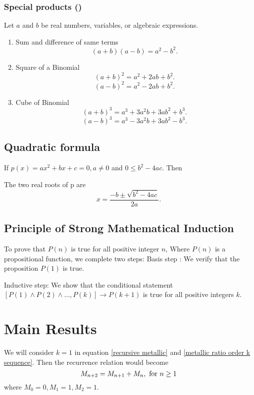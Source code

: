 \documentclass{rmutt-seminar}
\begin{document}
\subsubsection*{Special products (\cite{EP95})}
Let $a$ and $b$ be real numbers, variables, or algebraic expressions.
\begin{enumerate}
	\item Sum and difference of same terms 
	 $$(a+b)(a-b) = a^2-b^2.$$
	\item Square of a Binomial 
	 $$(a+b)^2 = a^2 +2ab+b^2.$$ 
	 $$(a-b)^2 = a^2 -2ab+b^2.$$
	\item Cube of Binomial 
	 $$(a+b)^3 = a^3+3a^2b+3ab^2+b^3.$$ 
	 $$(a-b)^3 = a^3-3a^2b+3ab^2-b^3.$$
\end{enumerate}

\subsection*{Quadratic formula}
\begin{theorem}[\cite{DC95}]
	If $ p(x) = ax^2 +bx + c = 0, a \neq 0 $ and $ 0 \leq b^2 - 4ac $. Then
	 
	The two real roots of  p are 
\begin{equation*}\label{quadratic formula}
	x= \frac{-b \pm \sqrt{b^2 - 4ac}}{2a}.
\end{equation*}
\end{theorem}
\subsection*{Principle of Strong Mathematical Induction}
\begin{theorem}[\cite{C10}] 
	To prove that $P(n)$ is true for all positive integer $n$, Where $P(n)$ is a propositional function, we complete two steps:
	\newline
	\indent Basis step : We verify that the proposition $P(1)$ is true.
	
	Inductive step: We show that the conditional statement  $[ P(1) \land P(2) \land \ldots ,P(k)]  \to P(k+1)$ is true for all positive integers $k$.
\end{theorem}
\section{Main Results}
\par
We will consider $ k = 1 $ in equation \eqref{recursive metallic} and \eqref{metallic ratio order k sequence}. Then the recurrence relation would become 
\begin{equation}\label{k = 1 in reccurence}
	 M_{n+2} = M_{n+1} + M_n, \textnormal{ for } n \geq 1
\end{equation}  
where $M_0=0, M_1=1, M_2=1.$
\newline
\end{document}
